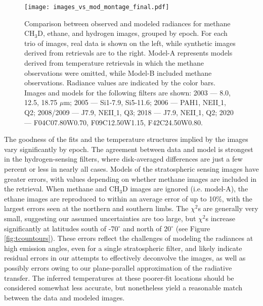 \documentclass[twocolumn,10pt]{aastex631}
\begin{document}
\begin{figure*}[h]
    \centering
    \texttt{[image: images\_vs\_mod\_montage\_final.pdf]}
        \caption{Comparison between observed and modeled radiances for methane CH$_3$D, ethane, and hydrogen images, grouped by epoch. For each trio of images, real data is shown on the left, while synthetic images derived from retrievals are to the right. Model-A represents models derived from temperature retrievals in which the methane observations were omitted, while Model-B included methane observations. Radiance values are indicated by the color bars. Images and models for the following filters are shown: 2003 --- 8.0, 12.5, 18.75 $\mu$m; 2005 --- Si1-7.9, Si5-11.6; 2006 --- PAH1, NEII$\_$1, Q2; 2008/2009 --- J7.9, NEII$\_$1, Q3; 2018 --- J7.9, NEII$\_$1, Q2; 2020 --- F04C07.80W0.70, F09C12.50W1.15, F42C24.50W0.80.}
    \label{fig:datvsmod} 
\end{figure*}

The goodness of the fits and the temperature structures implied by the images vary significantly by epoch. The agreement between data and model is strongest in the hydrogen-sensing filters, where disk-averaged differences are just a few percent or less in nearly all cases. Models of the stratospheric sensing images have greater errors, with values depending on whether methane images are included in the retrieval.  When methane and CH$_3$D images are ignored (i.e. model-A), the ethane images are reproduced to within an average error of up to 10$\%$, with the largest errors seen at the northern and southern limbs. The $\chi^2$s are generally very small, suggesting our assumed uncertainties are too large, but $\chi^2$s increase significantly at latitudes south of -70$^{\circ}$ and north of 20$^{\circ}$ (see Figure \ref{fig:tcountours}).  These errors reflect the challenges of modeling the radiances at high emission angles, even for a single stratospheric filter, and likely indicate residual errors in our attempts to effectively deconvolve the images, as well as possibly errors owing to our plane-parallel approximation of the radiative transfer. The inferred temperatures at these poorer-fit locations should be considered somewhat less accurate, but nonetheless yield a reasonable match between the data and modeled images.  
\end{document}
